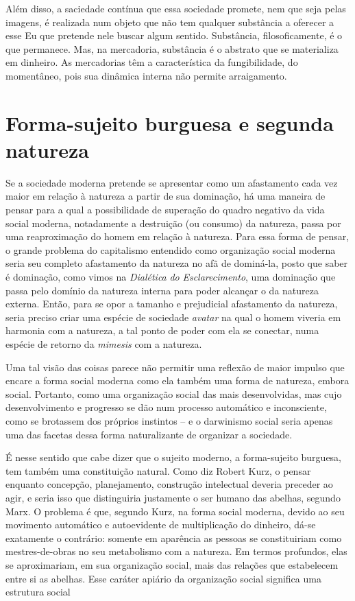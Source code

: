 Além disso, a saciedade contínua que essa sociedade promete, nem que
seja pelas imagens, é realizada num objeto que não tem qualquer
substância a oferecer a esse Eu que pretende nele buscar algum sentido.
Substância, filosoficamente, é o que permanece. Mas, na mercadoria,
substância é o abstrato que se materializa em dinheiro. As mercadorias
têm a característica da fungibilidade, do momentâneo, pois sua dinâmica
interna não permite arraigamento.

\section{Forma-sujeito burguesa e segunda natureza}

Se a sociedade moderna pretende se apresentar como um afastamento cada
vez maior em relação à natureza a partir de sua dominação, há uma
maneira de pensar para a qual a possibilidade de superação do quadro
negativo da vida social moderna, notadamente a destruição (ou consumo)
da natureza, passa por uma reaproximação do homem em relação à natureza.
Para essa forma de pensar, o grande problema do capitalismo entendido
como organização social moderna seria seu completo afastamento da
natureza no afã de dominá-la, posto que saber é dominação, como vimos na
\emph{Dialética} \emph{do} \emph{Esclarecimento}, uma dominação que
passa pelo domínio da natureza interna para poder alcançar o da natureza
externa. Então, para se opor a tamanho e prejudicial afastamento da
natureza, seria preciso criar uma espécie de sociedade \emph{avatar} na
qual o homem viveria em harmonia com a natureza, a tal ponto de poder
com ela se conectar, numa espécie de retorno da \emph{mimesis} com a
natureza.

Uma tal visão das coisas parece não permitir uma reflexão de maior
impulso que encare a forma social moderna como ela também uma forma de
natureza, embora social. Portanto, como uma organização social das mais
desenvolvidas, mas cujo desenvolvimento e progresso se dão num processo
automático e inconsciente, como se brotassem dos próprios instintos -- e
o darwinismo social seria apenas uma das facetas dessa forma
naturalizante de organizar a sociedade.

É nesse sentido que cabe dizer que o sujeito moderno, a forma-sujeito
burguesa, tem também uma constituição natural. Como diz Robert Kurz, o
pensar enquanto concepção, planejamento, construção intelectual deveria
preceder ao agir, e seria isso que distinguiria justamente o ser humano
das abelhas, segundo Marx. O problema é que, segundo Kurz, na forma
social moderna, devido ao seu movimento automático e autoevidente de
multiplicação do dinheiro, dá-se exatamente o contrário: somente em
aparência as pessoas se constituiriam como mestres-de-obras no seu
metabolismo com a natureza. Em termos profundos, elas se aproximariam,
em sua organização social, mais das relações que estabelecem entre si as
abelhas. Esse caráter apiário da organização social significa uma
estrutura social

